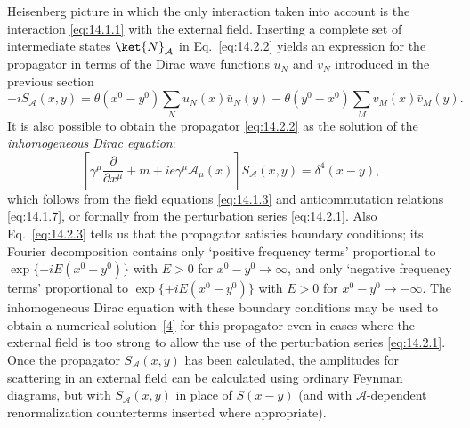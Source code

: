Heisenberg picture in which the only interaction taken into account is the
interaction \eqref{eq:14.1.1} with the external field. Inserting a complete set of
intermediate states $\ket{N}_{\mathcal A}$ in Eq.~\eqref{eq:14.2.2} yields an
expression for the propagator in terms of the Dirac wave functions $u_N$ and
$v_N$ introduced in the previous section
\begin{equation}
 -iS_{\mathcal A}(x,y)=\theta(x^0-y^0)\sum_Nu_N(x)\bar u_N(y)
 -\theta(y^0-x^0)\sum_Mv_M(x)\bar v_M(y).
 \tag{14.2.3}\label{eq:14.2.3}
\end{equation}
It is also possible to obtain the propagator \eqref{eq:14.2.2} as the solution of
the \emph{inhomogeneous Dirac equation}:
\begin{equation}
 \left[\gamma^\mu\frac{\partial}{\partial x^\mu}+m
 +ie\gamma^\mu\mathcal A_\mu(x)\right]S_{\mathcal A}(x,y)=\delta^4(x-y),
 \tag{14.2.4}\label{eq:14.2.4}
\end{equation}
which follows from the field equations \eqref{eq:14.1.3} and anticommutation
relations \eqref{eq:14.1.7}, or formally from the perturbation series
\eqref{eq:14.2.1}. Also Eq.~\eqref{eq:14.2.3} tells us that the propagator satisfies
boundary conditions; its Fourier decomposition contains only `positive
frequency terms' proportional to $\exp\{-iE(x^0-y^0)\}$ with $E>0$ for
$x^0-y^0\to\infty$, and only `negative frequency terms' proportional to
$\exp\{+iE(x^0-y^0)\}$ with $E>0$ for $x^0-y^0\to-\infty$. The inhomogeneous
Dirac equation with these boundary conditions may be used to obtain a
numerical solution~\hyperlink{ref:14.4}{[4]} for this propagator even in cases
where the external field is too strong to allow the use of the perturbation
series \eqref{eq:14.2.1}. Once the propagator $S_{\mathcal A}(x,y)$ has been
calculated, the amplitudes for scattering in an external field can be
calculated using ordinary Feynman diagrams, but with $S_{\mathcal A}(x,y)$ in
place of $S(x-y)$ (and with $\mathcal A$-dependent renormalization counterterms
inserted where appropriate).

